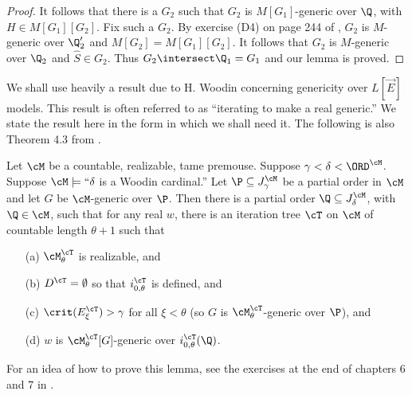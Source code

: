\begin{proof}
It follows  that there
is a $G_2$ such that $G_2$ is $M[G_1]$-generic over $\Q$, with
$H\in M[G_1][G_2]$. Fix such a $G_2$. By exercise (D4) on page
244 of \cite{Kunen_Book}, $G_2$ is $M$-generic over $\Q_2^{\prime}$
and $M[G_2]=M[G_1][G_2]$. It follows that $G_2$ is $M$-generic
over $\Q_2$ and $\hat{S}\in G_2$. Thus $G_2\intersect\Q_1=G_1$ and
our lemma is proved.
\end{proof}


We shall use heavily a result due to H. Woodin concerning genericity over
$L[\vec{E}]$ models. This result is often referred  to as ``iterating
to make a real generic.'' We state the result here in the form in which
we shall need it. The following is also Theorem 4.3 from
\cite{Many_Woodins}.

\begin{lemma}[Woodin]
\label{MakeRealGeneric}
Let $\cM$ be a countable, realizable,  tame premouse.  Suppose
$\gamma<\delta<\ORD^{\cM}$. Suppose
$\cM\models\text{``}\delta$ is a Woodin cardinal.''
Let $\P\subseteq J^{\cM}_{\gamma}$ be a partial
order in $\cM$ and let $G$ be $\cM$-generic over $\P$. Then there
is a partial order $\Q\subseteq J^{\cM}_{\delta}$, with
$\Q\in \cM$, such that for any real $w$, there is an
iteration tree $\cT$ on $\cM$ of countable length $\theta+1$ such that
\begin{itemize}
\item[(a)] $\cM^{\cT}_{\theta}$ is realizable, and
\item[(b)] $D^{\cT}=\emptyset$ so that $i^{\cT}_{0,\theta}$ is defined,
and
\item[(c)] $\crit(E^{\cT}_{\xi}) > \gamma$ for all $\xi<\theta$
(so $G$ is $\cM^{\cT}_{\theta}$-generic over $\P$), and
\item[(d)] $w$ is $\cM^{\cT}_{\theta}[G]$-generic over
$i^{\cT}_{0,\theta}(\Q)$.
\end{itemize}
\end{lemma}

For an idea of how to prove this lemma, see the exercises at the
end of chapters 6 and 7 in \cite{Martin_Book}.

